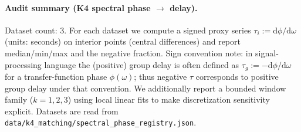 \paragraph{Audit summary (K4 spectral phase $\to$ delay).} \AuditTag Dataset count: 3. For each dataset we compute a signed proxy series $\tau_i:=\mathrm{d}\phi/\mathrm{d}\omega$ (units: seconds) on interior points (central differences) and report median/min/max and the negative fraction. Sign convention note: in signal-processing language the (positive) group delay is often defined as $\tau_g:=-\mathrm{d}\phi/\mathrm{d}\omega$ for a transfer-function phase $\phi(\omega)$; thus negative $\tau$ corresponds to positive group delay under that convention. We additionally report a bounded window family ($k=1,2,3$) using local linear fits to make discretization sensitivity explicit. Datasets are read from \texttt{data/k4\_matching/spectral\_phase\_registry.json}.